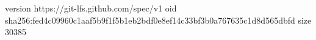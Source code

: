 version https://git-lfs.github.com/spec/v1
oid sha256:fed4c09960c1aaf5b9f1f5b1eb2bdf0e8ef14c33bf3b0a767635c1d8d565dbfd
size 30385
